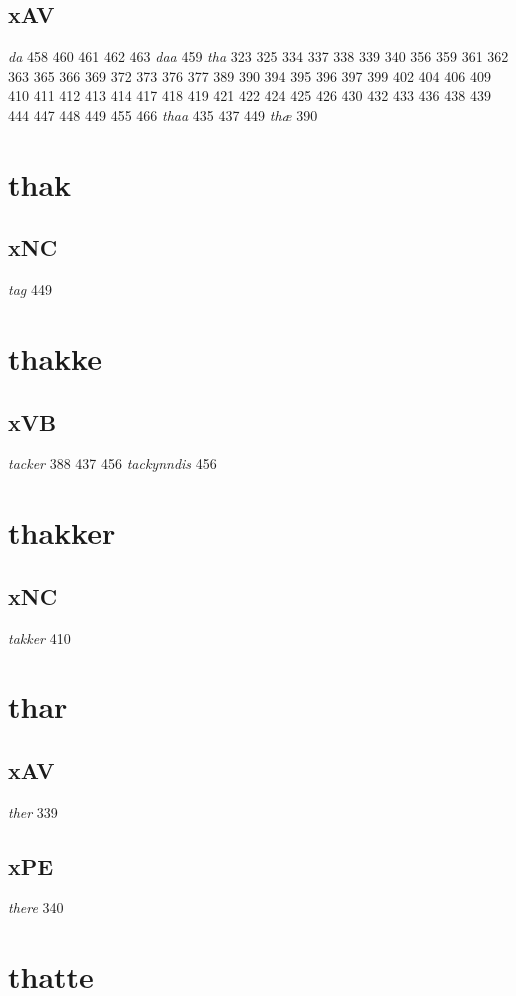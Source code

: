 \documentclass[a4paper,twocolumn]{article}
\begin{document}
\subsection{xAV}
\label{sec:org2832350}
\emph{da} 458 460 461 462 463 \emph{daa} 459 \emph{tha} 323 325 334 337 338 339 340 356 359 361 362 363 365 366 369 372 373 376 377 389 390 394 395 396 397 399 402 404 406 409 410 411 412 413 414 417 418 419 421 422 424 425 426 430 432 433 436 438 439 444 447 448 449 455 466 \emph{thaa} 435 437 449 \emph{thæ} 390 
\section{thak}
\label{sec:orge1c6852}
\subsection{xNC}
\label{sec:orge396fba}
\emph{tag} 449 
\section{thakke}
\label{sec:org3da3414}
\subsection{xVB}
\label{sec:orgfbd7641}
\emph{tacker} 388 437 456 \emph{tackynndis} 456 
\section{thakker}
\label{sec:org2207875}
\subsection{xNC}
\label{sec:org792b29d}
\emph{takker} 410 
\section{thar}
\label{sec:org0bc7652}
\subsection{xAV}
\label{sec:org0c47d18}
\emph{ther} 339 
\subsection{xPE}
\label{sec:orgd7d3029}
\emph{there} 340 
\section{thatte}
\label{sec:orgfea5744}
\end{document}
